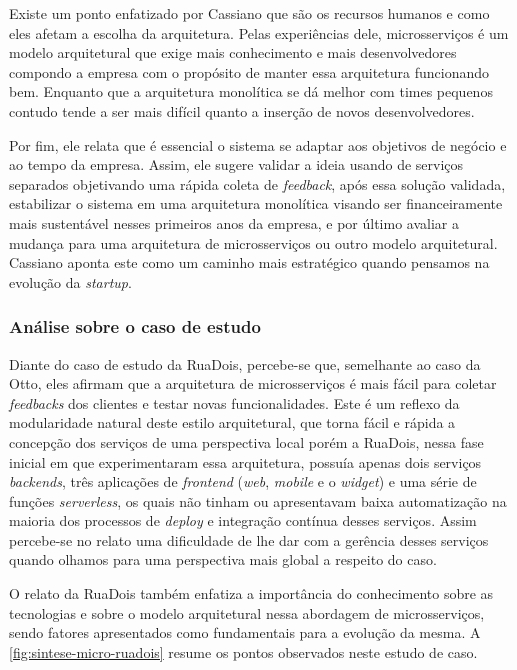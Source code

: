Existe um ponto enfatizado por Cassiano que são os recursos humanos e como eles afetam a escolha da
arquitetura. Pelas experiências dele, microsserviços é um modelo arquitetural que exige mais conhecimento
e mais desenvolvedores compondo a empresa com o propósito de manter essa arquitetura funcionando bem.
Enquanto que a arquitetura monolítica se dá melhor com times pequenos contudo tende a ser mais difícil
quanto a inserção de novos desenvolvedores.

Por fim, ele relata que é essencial o sistema se adaptar aos objetivos de negócio e ao tempo da
empresa. Assim, ele sugere validar a ideia usando de serviços separados objetivando uma rápida coleta de
\textit{feedback}, após essa solução validada, estabilizar o sistema em uma arquitetura monolítica
visando ser financeiramente mais sustentável nesses primeiros anos da empresa, e por último avaliar
a mudança para uma arquitetura de microsserviços ou outro modelo arquitetural. Cassiano aponta este
como um caminho mais estratégico quando pensamos na evolução da \textit{startup}.

\subsubsection{Análise sobre o caso de estudo}

Diante do caso de estudo da RuaDois, percebe-se que, semelhante ao caso da Otto, eles afirmam que a
arquitetura de microsserviços é mais fácil para coletar \textit{feedbacks} dos clientes e testar
novas funcionalidades. Este é um reflexo da modularidade natural deste estilo arquitetural, que
torna fácil e rápida a concepção dos serviços de uma perspectiva local porém a RuaDois, nessa fase inicial
em que experimentaram essa arquitetura, possuía apenas dois serviços \textit{backends}, três
aplicações de \textit{frontend} (\textit{web}, \textit{mobile} e o \textit{widget}) e uma série de
funções \textit{serverless}, os quais não tinham ou apresentavam baixa automatização na maioria dos processos
de \textit{deploy} e integração contínua desses serviços. Assim percebe-se no relato uma dificuldade de lhe dar
com a gerência desses serviços quando olhamos para uma perspectiva mais global a respeito do caso.

O relato da RuaDois também enfatiza a importância do conhecimento sobre as tecnologias e sobre o
modelo arquitetural nessa abordagem de microsserviços, sendo fatores apresentados como fundamentais
para a evolução da mesma. A \autoref{fig:sintese-micro-ruadois} resume os pontos observados neste
estudo de caso.

